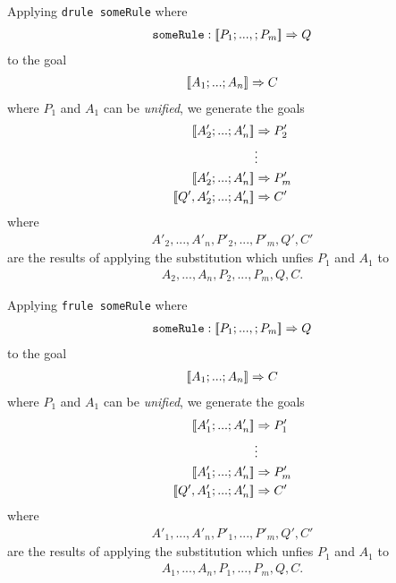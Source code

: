 \documentclass{article}
\begin{document}
\begin{definition}
    Applying \texttt{drule someRule} where
    \begin{align*}
        \texttt{someRule} : [\![P_1;...,;P_m]\!] \Rightarrow Q
    \end{align*}
    to the goal
    \begin{align*}
        [\![A_1; ...; A_n]\!] \Rightarrow C
    \end{align*}
    where $P_1$ and $A_1$ can be \emph{unified}, we generate the goals
    \begin{align*}
        \db{A'_2; ...; A'_n}    & \Rightarrow P'_2 \\
                                & \vdots           \\
        \db{A'_2; ...; A'_n}    & \Rightarrow P'_m \\
        \db{Q',A'_2; ...; A'_n} & \Rightarrow C'
    \end{align*}
    where \begin{align*}
        A'_2, ..., A'_n,P'_2,...,P'_m,Q',C'
    \end{align*}
    are the results of applying the
    substitution which unfies $P_1$ and $A_1$ to
    \begin{align*}
        A_2,...,A_n,P_2,...,P_m,Q,C.
    \end{align*}
\end{definition}
\begin{definition}
    Applying \texttt{frule someRule} where
    \begin{align*}
        \texttt{someRule} : [\![P_1;...,;P_m]\!] \Rightarrow Q
    \end{align*}
    to the goal
    \begin{align*}
        [\![A_1; ...; A_n]\!] \Rightarrow C
    \end{align*}
    where $P_1$ and $A_1$ can be \emph{unified}, we generate the goals
    \begin{align*}
        \db{A'_1; ...; A'_n}    & \Rightarrow P'_1 \\
                                & \vdots           \\
        \db{A'_1; ...; A'_n}    & \Rightarrow P'_m \\
        \db{Q',A'_1; ...; A'_n} & \Rightarrow C'
    \end{align*}
    where \begin{align*}
        A'_1, ..., A'_n,P'_1,...,P'_m,Q',C'
    \end{align*}
    are the results of applying the
    substitution which unfies $P_1$ and $A_1$ to
    \begin{align*}
        A_1,...,A_n,P_1,...,P_m,Q,C.
    \end{align*}
\end{definition}
\end{document}
